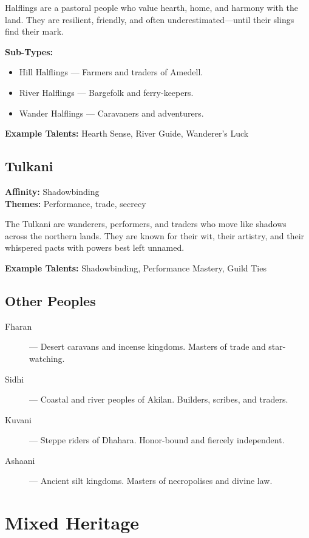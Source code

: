 Halflings are a pastoral people who value hearth, home, and harmony with the land. They are resilient, friendly, and often underestimated—until their slings find their mark.

\textbf{Sub-Types:}
\begin{itemize}
  \item Hill Halflings — Farmers and traders of Amedell.
  \item River Halflings — Bargefolk and ferry-keepers.
  \item Wander Halflings — Caravaners and adventurers.
\end{itemize}

\textbf{Example Talents:} Hearth Sense, River Guide, Wanderer's Luck

\subsection*{Tulkani}

\textbf{Affinity:} Shadowbinding \\
\textbf{Themes:} Performance, trade, secrecy

The Tulkani are wanderers, performers, and traders who move like shadows across the northern lands. They are known for their wit, their artistry, and their whispered pacts with powers best left unnamed.

\textbf{Example Talents:} Shadowbinding, Performance Mastery, Guild Ties

\subsection*{Other Peoples}

\begin{description}
  \item[Fharan] — Desert caravans and incense kingdoms. Masters of trade and star-watching.
  \item[Sidhi] — Coastal and river peoples of Akilan. Builders, scribes, and traders.
  \item[Kuvani] — Steppe riders of Dhahara. Honor-bound and fiercely independent.
  \item[Ashaani] — Ancient silt kingdoms. Masters of necropolises and divine law.
\end{description}

\section{Mixed Heritage}

